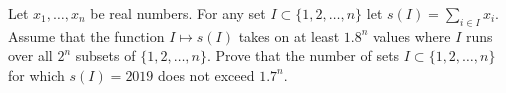 \documentclass{article}
\begin{document}
\setlength{\parindent}{0pt}
Let \(\displaystyle x_1,\ldots,x_n\) be real numbers. For any set \(\displaystyle I\subset \{1,2,\ldots,n\}\) let \(\displaystyle s(I)=\sum\limits_{i\in I} x_i\). Assume that the function \(\displaystyle I\mapsto s(I)\) takes on at least \(\displaystyle 1.8^n\) values where \(\displaystyle I\) runs over all \(\displaystyle 2^n\) subsets of \(\displaystyle \{1,2,\ldots,n\}\). Prove that the number of sets \(\displaystyle I\subset \{1,2,\ldots,n\}\) for which \(\displaystyle s(I)=2019\) does not exceed \(\displaystyle 1.7^n\).
\end{document}
